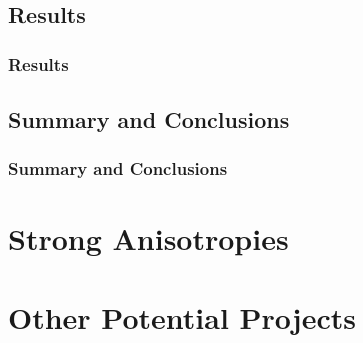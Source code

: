 \documentclass[xcolor=x11names,compress]{beamer}
\renewcommand{\(}{\begin{columns}}
\renewcommand{\)}{\end{columns}}
\newcommand{\<}[1]{\begin{column}{#1}}
\renewcommand{\>}{\end{column}}
\begin{document}
\subsection{Results}
\begin{frame}[fragile]
  \frametitle{Results}
  
\end{frame}


\subsection{Summary and Conclusions}
\begin{frame}[fragile]
  \frametitle{Summary and Conclusions}
  
\end{frame}

\section{Strong Anisotropies}
\begin{frame}[fragile]
  \frametitle{}

  
\end{frame}


\section{Other Potential Projects}
\begin{frame}[fragile]
  \frametitle{}

  
\end{frame}


\end{document}
